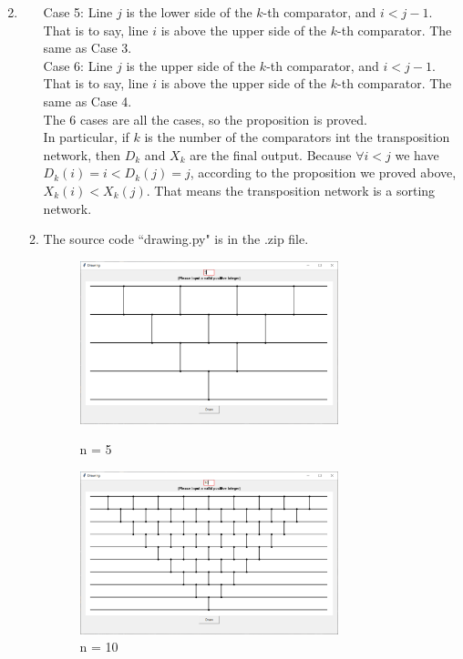 \documentclass[12pt,a4paper]{article}
\makeatletter
\newtheorem*{solution}{Solution}
\theoremstyle{definition}
\renewenvironment{solution}[1][Solution] {\par\pushQED{\qed}\normalfont\topsep6\p@\@plus6\p@\relax\trivlist\item[\hskip\labelsep\bfseries#1\@addpunct{.}]\ignorespaces}{\popQED\endtrivlist\@endpefalse} \makeatother
\makeatother
\begin{document}
\begin{enumerate}
\begin{solution}
\begin{enumerate}
Case 5: Line $j$ is the lower side of the $k$-th comparator, and $i<j-1$. That is to say, line $i$ is above the upper side of the $k$-th comparator. The same as Case 3.\\

Case 6: Line $j$ is the upper side of the $k$-th comparator, and $i<j-1$. That is to say, line $i$ is above the upper side of the $k$-th comparator. The same as Case 4.\\

The 6 cases are all the cases, so the proposition is proved.\\

In particular, if $k$ is the number of the comparators int the transposition network, then $D_k$ and $X_k$ are the final output. Because $\forall i<j$ we have $D_k(i) = i < D_k(j) = j$, according to the proposition we proved above, $X_k(i)  < X_k(j)$. That means the transposition network is a sorting network. 

\item

The source code ``drawing.py" is in the .zip file.
\begin{figure}[H]
\centering
\begin{minipage}[t]{0.48\textwidth}
\centering
\includegraphics[width=7.5cm]{n=5.png}
\caption{n = 5}
\end{minipage}
\begin{minipage}[t]{0.48\textwidth}
\centering
\includegraphics[width=7.5cm]{n=10.png}
\caption{n = 10}
\end{minipage}
\end{figure}


\end{enumerate}
\end{solution}
\end{enumerate}
\end{document}
